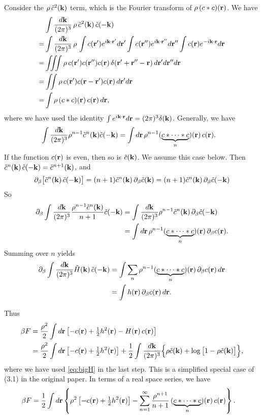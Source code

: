 \documentclass[12pt]{article}
\begin{document}
Consider the $\rho \, \tilde{c}^2(\mathbf{k})$ term,
  which is the Fourier transform of $\rho \, (c*c)(\mathbf{r})$.
%
We have
\begin{align*}
&  \int \frac{ d \mathbf{k} }{(2\pi)^3} \,
  \rho \, \tilde{c}^2(\mathbf{k}) \, \tilde{c}(-\mathbf{k}) \\
=&
  \int \frac{ d \mathbf{k} }{(2\pi)^3} \,
    \rho \,
    \int c(\mathbf{r}')  e^{ i \mathbf{k}\cdot \mathbf{r}'}   d \mathbf{r}'
    \int c(\mathbf{r}'') e^{ i \mathbf{k}\cdot \mathbf{r}''}  d \mathbf{r}''
    \int c(\mathbf{r})   e^{-i \mathbf{k}\cdot \mathbf{r}}    d \mathbf{r} \\
=&
    \iiint
    \rho \,
    c(\mathbf{r}') c(\mathbf{r}'') c(\mathbf{r})
    \, \delta(\mathbf{r}' + \mathbf{r}'' - \mathbf{r}) \,
    d \mathbf{r}'
    d \mathbf{r}''
    d \mathbf{r} \\
=&
    \iint
    \rho \,
    c(\mathbf{r}')  c(\mathbf{r} - \mathbf{r}') c(\mathbf{r}) \,
    d \mathbf{r}'
    d \mathbf{r} \\
=&  \int \rho \, (c*c)(\mathbf{r}) \, c(\mathbf{r}) \,
    d \mathbf{r},
\end{align*}
where we have used the identity
$\int e^{i \mathbf{k}\cdot \mathbf{r}} d \mathbf{r} = (2\pi)^3 \delta(\mathbf{k})$.
%
Generally, we have
%
\begin{align*}
  & \int \frac{ d \mathbf{k} }{(2\pi)^3}
    \rho^{n-1} \tilde{c}^n(\mathbf{k})
     \tilde{c}(-\mathbf{k})
  = \int d\mathbf{r} \,
  \rho^{n-1} (\underbrace{c*\dots*c}_n)(\mathbf{r}) \, c(\mathbf{r}).
\end{align*}
%
If the function $c(\mathbf{r})$ is even, then so is $\tilde{c}(\mathbf{k})$.
We assume this case below.
Then $\tilde{c}^n(\mathbf{k}) \, \tilde{c}(-\mathbf{k}) = \tilde{c}^{n+1}(\mathbf{k})$,
  and
\[
  \partial_\beta \big[ \tilde{c}^n(\mathbf{k}) \, \tilde{c}(-\mathbf{k}) \big]
  = (n+1) \tilde{c}^n(\mathbf{k}) \, \partial_\beta \tilde{c}(\mathbf{k})
  = (n+1) \tilde{c}^n(\mathbf{k}) \, \partial_\beta \tilde{c}(-\mathbf{k})
\]
So
%
\begin{align*}
  \partial_\beta  \int \frac{ d \mathbf{k} }{(2\pi)^3}
  \frac{\rho^{n-1} \tilde{c}^n(\mathbf{k}) }{n+1} \tilde{c}(-\mathbf{k})
  &= \int \frac{ d \mathbf{k} }{(2\pi)^3}
  \rho^{n-1} \tilde{c}^n(\mathbf{k}) \, \partial_\beta \tilde{c}(-\mathbf{k}) \\
  &=  \int d \mathbf{r} \,
  \rho^{n-1} (\underbrace{c*\dots*c}_n)(\mathbf{r}) \, \partial_\beta c(\mathbf{r}).
\end{align*}
%
Summing over $n$ yields
%
\begin{align*}
  \partial_\beta  \int \frac{ d \mathbf{k} }{(2\pi)^3}
  \tilde{H}(\mathbf{k}) \, \tilde{c}(-\mathbf{k})
  &= \int \sum_{n} \rho^{n-1}(\underbrace{c*\dots*c}_n)(\mathbf{r}) \, \partial_\beta c(\mathbf{r}) \,
    d \mathbf{r} \\
  &= \int h(\mathbf{r}) \, \partial_\beta c(\mathbf{r}) \,
    d \mathbf{r}.
\end{align*}
%
%

Thus
%
\begin{align}
\beta F
&=
  \frac{\rho^2}{2}
  \int d\mathbf{r}
  \left[
    - c(\mathbf{r})
    + \tfrac{1}{2} h^2(\mathbf{r})
    - H(\mathbf{r}) \, c(\mathbf{r})
  \right] \notag \\
  &=
  \frac{\rho^2}{2}
  \int d\mathbf{r}
  \left[
    - c(\mathbf{r})
    + \tfrac{1}{2} h^2(\mathbf{r})
  \right]
  +
  \frac{1}{2}
  \int \frac{ d \mathbf{k} }{(2\pi)^3}
    \Big\{
      \rho \tilde{c}(\mathbf{k})
      + \log\big[ 1 - \rho \tilde{c}(\mathbf{k})  \big]
    \Big\},
  \label{eq:freeEnergy}
\end{align}
%
where we have used \eqref{eq:bigH} in the last step.
%
This is a simplified special case of (3.1) in the original paper.
%
In terms of a real space series, we have
%
\begin{align}
\beta F
  &=
  \frac{1}{2}
  \int d\mathbf{r}
  \left\{
    \rho^2
    \left[
      - c(\mathbf{r})
      + \tfrac{1}{2} h^2(\mathbf{r})
    \right]
  -
  \sum_{n = 1}^{\infty}
    \frac{\rho^{n+1}}{n+1} \, (\underbrace{c*\dots*c}_{n})(\mathbf{r}) \, c(\mathbf{r})
  \right\}.
\end{align}
%
\end{document}

